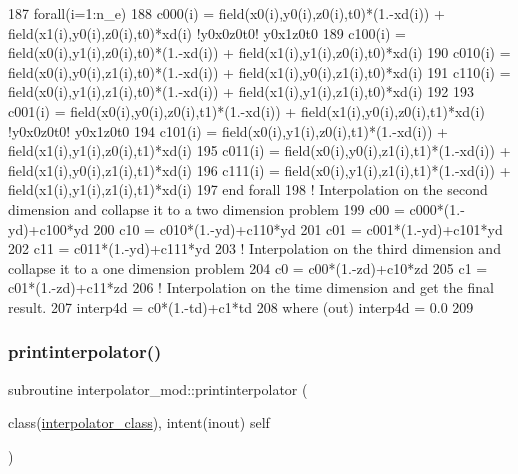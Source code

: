 \begin{DoxyCode}
187     \textcolor{keywordflow}{forall}(i=1:n\_e)
188         c000(i) = field(x0(i),y0(i),z0(i),t0)*(1.-xd(i)) + field(x1(i),y0(i),z0(i),t0)*xd(i) \textcolor{comment}{!y0x0z0t0! 
       y0x1z0t0}
189         c100(i) = field(x0(i),y1(i),z0(i),t0)*(1.-xd(i)) + field(x1(i),y1(i),z0(i),t0)*xd(i)
190         c010(i) = field(x0(i),y0(i),z1(i),t0)*(1.-xd(i)) + field(x1(i),y0(i),z1(i),t0)*xd(i)
191         c110(i) = field(x0(i),y1(i),z1(i),t0)*(1.-xd(i)) + field(x1(i),y1(i),z1(i),t0)*xd(i)
192 
193         c001(i) = field(x0(i),y0(i),z0(i),t1)*(1.-xd(i)) + field(x1(i),y0(i),z0(i),t1)*xd(i) \textcolor{comment}{!y0x0z0t0! 
       y0x1z0t0}
194         c101(i) = field(x0(i),y1(i),z0(i),t1)*(1.-xd(i)) + field(x1(i),y1(i),z0(i),t1)*xd(i)
195         c011(i) = field(x0(i),y0(i),z1(i),t1)*(1.-xd(i)) + field(x1(i),y0(i),z1(i),t1)*xd(i)
196         c111(i) = field(x0(i),y1(i),z1(i),t1)*(1.-xd(i)) + field(x1(i),y1(i),z1(i),t1)*xd(i)
197 \textcolor{keywordflow}{    end forall}
198     \textcolor{comment}{! Interpolation on the second dimension and collapse it to a two dimension problem}
199     c00 = c000*(1.-yd)+c100*yd
200     c10 = c010*(1.-yd)+c110*yd
201     c01 = c001*(1.-yd)+c101*yd
202     c11 = c011*(1.-yd)+c111*yd
203     \textcolor{comment}{! Interpolation on the third dimension and collapse it to a one dimension problem}
204     c0 = c00*(1.-zd)+c10*zd
205     c1 = c01*(1.-zd)+c11*zd
206     \textcolor{comment}{! Interpolation on the time dimension and get the final result.}
207     interp4d = c0*(1.-td)+c1*td
208     \textcolor{keywordflow}{where} (out) interp4d = 0.0
209 
\end{DoxyCode}
\mbox{\label{namespaceinterpolator__mod_a9b149bc8a3da5d1864b8c049f8b00697}} 
\subsubsection{\texorpdfstring{printinterpolator()}{printinterpolator()}}
{\footnotesize\ttfamily subroutine interpolator\+\_\+mod\+::printinterpolator (\begin{DoxyParamCaption}\item[{class(\mbox{\hyperlink{structinterpolator__mod_1_1interpolator__class}{interpolator\+\_\+class}}), intent(inout)}]{self }\end{DoxyParamCaption})\hspace{0.3cm}{\ttfamily [private]}}



